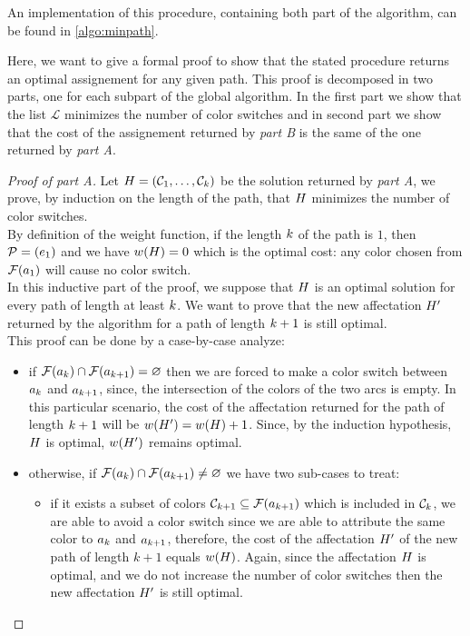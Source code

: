 An implementation of this procedure, containing both part of the algorithm, can be found in \cref{algo:minpath}.

Here, we want to give a formal proof to show that the stated procedure returns an optimal assignement for any given path. This proof is decomposed in two parts, one for each subpart of the global algorithm. In the first part we show that the list $\mathcal{L}$ minimizes the number of color switches and in second part we show that the cost of the assignement returned by \textit{part B} is the same of the one returned by \textit{part A}.

\begin{proof}[Proof of \textit{part A}]
	\def\solPartOne{\affect}
	Let $\solPartOne = \row{\C}{\len}$ be the solution returned by \textit{part A}, we prove, by induction on the length of the path, that $\solPartOne$ minimizes the number of color switches. \\
	By definition of the weight function, if the length $k$ of the path is $1$, then $\mathcal{P} = (e_1)$ and we have $\weight(\solPartOne) = 0$ which is the optimal cost: any color chosen from $\mathcal{F}(a_1)$ will cause no color switch.\\
	In this inductive part of the proof, we suppose that $\solPartOne$ is an optimal solution for every path of length at least $k$. We want to prove that the new affectation $\solPartOne'$ returned by the algorithm for a path of length $k+1$ is still optimal. \\
	This proof can be done by a case-by-case analyze:

	\begin{itemize}
		\item if $\mathcal{F}(a_k) \cap \mathcal{F}(a_{k+1}) = \varnothing$ then we are forced to make a color switch between $a_k$ and $a_{k+1}$, since, the intersection of the colors of the two arcs is empty. In this particular scenario, the cost of the affectation returned for the path of length $k + 1$ will be $\weight(\solPartOne') = \weight(\solPartOne) + 1$. Since, by the induction hypothesis, $\solPartOne$ is optimal, $w(H')$ remains optimal.
		\item otherwise, if $\mathcal{F}(a_k) \cap \mathcal{F}(a_{k+1}) \neq \varnothing$ we have two sub-cases to treat:
		      \begin{itemize}

			      \item if it exists a subset of colors $\mathcal{C}_{k+1} \subseteq \mathcal{F}(a_{k+1})$ which is included in $\mathcal{C}_k$, we are able to avoid a color switch since we are able to attribute the same color to $a_k$ and $a_{k+1}$, therefore, the cost of the affectation $\solPartOne'$ of the new path of length $k+1$ equals $\weight(\solPartOne)$. Again, since the affectation $\solPartOne$ is optimal, and we do not increase the number of color switches then the new affectation $\solPartOne'$ is still optimal.


\end{itemize}
\end{itemize}
\end{proof}
